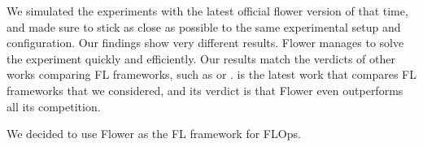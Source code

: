 We simulated the experiments with the latest official flower version of that time,
and made sure to stick as close as possible to the same experimental setup and configuration.
Our findings show very different results.
Flower manages to solve the experiment quickly and efficiently.
Our results match the verdicts of other works comparing FL frameworks, such as \cite{comparative_analysis_of_fl_frameworks} or \cite{comprehensive_study_fl_frameworks_degree_project}.
\cite{comparative_analysis_of_fl_frameworks} is the latest work that compares FL frameworks that we considered,
and its verdict is that Flower even outperforms all its competition.

We decided to use Flower as the FL framework for FLOps.